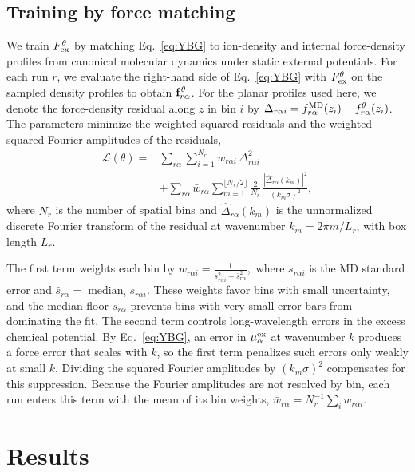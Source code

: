 \subsection*{Training by force matching}
We train $F^\theta_{\rm ex}$ by matching Eq.~\ref{eq:YBG} to ion-density and internal force-density profiles from canonical molecular dynamics under static external potentials. For each run $r$, we evaluate the right-hand side of Eq.~\ref{eq:YBG} with $F^\theta_{\rm ex}$ on the sampled density profiles to obtain $\mathbf f^\theta_{r\alpha}$. For the planar profiles used here, we denote the force-density residual along $z$ in bin $i$ by $\Delta_{r\alpha i}=f^{\rm MD}_{r\alpha}(z_i)-f^\theta_{r\alpha}(z_i)$. The parameters minimize the weighted squared residuals and the weighted squared Fourier amplitudes of the residuals,
\begin{equation}
\begin{aligned}
\mathcal L(\theta)={}&\sum_{r\alpha}\sum_{i=1}^{N_r}w_{r\alpha i}\,\Delta_{r\alpha i}^2\\
&+\sum_{r\alpha}\bar w_{r\alpha}\sum_{m=1}^{\lfloor N_r/2\rfloor}
\frac{2}{N_r}\,\frac{|\widehat\Delta_{r\alpha}(k_m)|^2}{(k_m\sigma)^2},
\end{aligned}
\label{eq:loss}
\end{equation}
where $N_r$ is the number of spatial bins and $\widehat{\Delta}_{r\alpha}(k_m)$ is the unnormalized discrete Fourier transform of the residual at wavenumber $k_m=2\pi m/L_r$, with box length $L_r$.

The first term weights each bin by
\(
w_{r\alpha i}=\frac{1}{s_{r\alpha i}^2+\bar s_{r\alpha}^2},
\)
where $s_{r\alpha i}$ is the MD standard error and $\bar s_{r\alpha}=\operatorname{median}_i s_{r\alpha i}$. These weights favor bins with small uncertainty, and the median floor $\bar s_{r\alpha}$ prevents bins with very small error bars from dominating the fit. The second term controls long-wavelength errors in the excess chemical potential. By Eq.~\ref{eq:YBG}, an error in $\mu^{\rm ex}_\alpha$ at wavenumber $k$ produces a force error that scales with $k$, so the first term penalizes such errors only weakly at small $k$. Dividing the squared Fourier amplitudes by $(k_m\sigma)^2$ compensates for this suppression. Because the Fourier amplitudes are not resolved by bin, each run enters this term with the mean of its bin weights, $\bar w_{r\alpha}=N_r^{-1}\sum_i w_{r\alpha i}$. 
\section*{Results}


